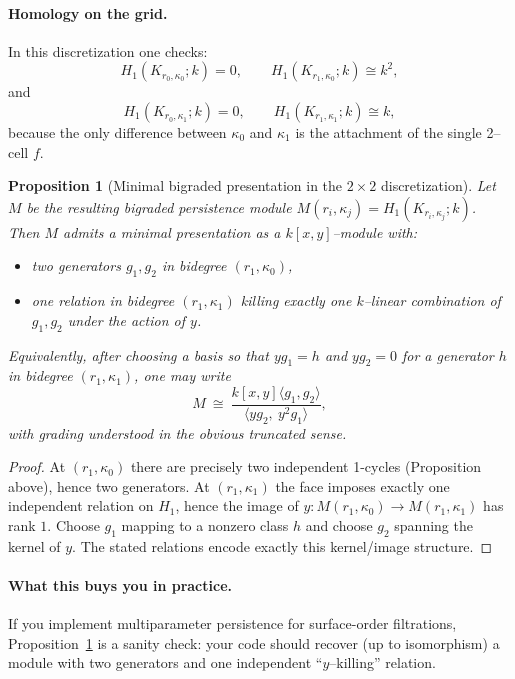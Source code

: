\documentclass[11pt,oneside]{amsbook}
\numberwithin{equation}{section}
\theoremstyle{plain}
\newtheorem{proposition}[theorem]{Proposition}
\theoremstyle{definition}
\theoremstyle{remark}
\begin{document}
\paragraph{Homology on the grid.}
In this discretization one checks:
\[
H_1(K_{r_0,\kappa_0};k)=0,\qquad H_1(K_{r_1,\kappa_0};k)\cong k^2,
\]
and
\[
H_1(K_{r_0,\kappa_1};k)=0,\qquad H_1(K_{r_1,\kappa_1};k)\cong k,
\]
because the only difference between $\kappa_0$ and $\kappa_1$ is the attachment of the single 2--cell $f$.

\begin{proposition}[Minimal bigraded presentation in the $2\times 2$ discretization]
\label{prop:2x2_persistence_presentation}
Let $M$ be the resulting bigraded persistence module $M(r_i,\kappa_j)=H_1(K_{r_i,\kappa_j};k)$.
Then $M$ admits a minimal presentation as a $k[x,y]$--module with:
\begin{itemize}
\item two generators $g_1,g_2$ in bidegree $(r_1,\kappa_0)$,
\item one relation in bidegree $(r_1,\kappa_1)$ killing exactly one $k$--linear combination of $g_1,g_2$ under the action of $y$.
\end{itemize}
Equivalently, after choosing a basis so that $y g_1=h$ and $y g_2=0$ for a generator $h$ in bidegree $(r_1,\kappa_1)$, one may write
\[
M \ \cong\  \frac{k[x,y]\langle g_1,g_2\rangle}{\langle y g_2,\ y^2 g_1\rangle},
\]
with grading understood in the obvious truncated sense.
\end{proposition}

\begin{proof}
At $(r_1,\kappa_0)$ there are precisely two independent 1-cycles (Proposition above), hence two generators.
At $(r_1,\kappa_1)$ the face imposes exactly one independent relation on $H_1$, hence the image of $y:M(r_1,\kappa_0)\to M(r_1,\kappa_1)$ has rank $1$.
Choose $g_1$ mapping to a nonzero class $h$ and choose $g_2$ spanning the kernel of $y$.
The stated relations encode exactly this kernel/image structure.
\end{proof}

\paragraph{What this buys you in practice.}
If you implement multiparameter persistence for surface-order filtrations, Proposition~\ref{prop:2x2_persistence_presentation} is a sanity check:
your code should recover (up to isomorphism) a module with two generators and one independent ``$y$--killing'' relation.
\end{document}
